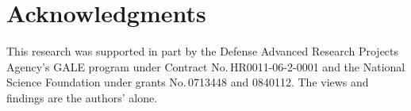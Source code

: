 \documentclass[11pt]{article}
\begin{document}


\section*{Acknowledgments}
This research was supported in part by the Defense Advanced Research Projects Agency's GALE program under Contract No.\,HR0011-06-2-0001 and the National Science Foundation under grants No.\,0713448 and 0840112. The views and findings are the authors' alone.




\end{document}
